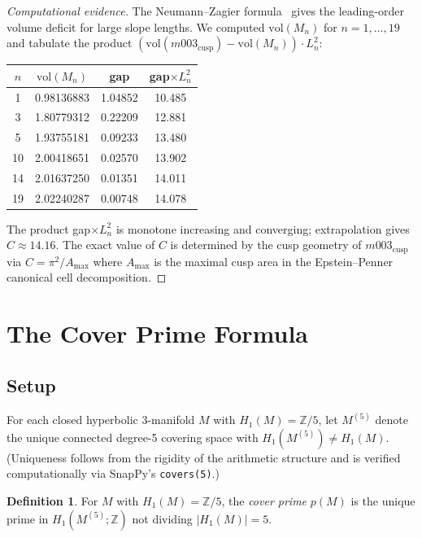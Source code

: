 \documentclass[11pt,a4paper]{article}
\theoremstyle{definition}
\newtheorem{definition}[theorem]{Definition}
\newcommand{\ZZ}{\mathbb{Z}}
\newcommand{\Zfive}{\ZZ/5}
\newcommand{\vol}{\mathrm{vol}}
\newcommand{\Mn}{M_n}
\newcommand{\Mcusp}{m003_{\mathrm{cusp}}}
\begin{document}
\begin{proof}[Computational evidence]
The Neumann--Zagier formula~\cite{NZ85} gives the leading-order
volume deficit for large slope lengths.
We computed $\vol(\Mn)$ for $n=1,\ldots,19$ and tabulate the
product $(\vol(\Mcusp)-\vol(\Mn))\cdot L_n^2$:

\begin{center}
\begin{tabular}{cccc}
\toprule
$n$ & $\vol(\Mn)$ & gap & gap$\times L_n^2$ \\
\midrule
 1 & 0.98136883 & 1.04852 & 10.485 \\
 3 & 1.80779312 & 0.22209 & 12.881 \\
 5 & 1.93755181 & 0.09233 & 13.480 \\
10 & 2.00418651 & 0.02570 & 13.902 \\
14 & 2.01637250 & 0.01351 & 14.011 \\
19 & 2.02240287 & 0.00748 & 14.078 \\
\bottomrule
\end{tabular}
\end{center}

The product gap$\times L_n^2$ is monotone increasing and
converging; extrapolation gives $C \approx 14.16$.
The exact value of $C$ is determined by the cusp geometry
of $\Mcusp$ via $C = \pi^2/A_{\mathrm{max}}$ where
$A_{\mathrm{max}}$ is the maximal cusp area in the
Epstein--Penner canonical cell decomposition.
\end{proof}

\section{The Cover Prime Formula}
\label{sec:cover}

\subsection{Setup}

For each closed hyperbolic 3-manifold $M$ with $H_1(M)=\Zfive$,
let $M^{(5)}$ denote the unique connected degree-5 covering space
with $H_1(M^{(5)}) \neq H_1(M)$.
(Uniqueness follows from the rigidity of the arithmetic structure
and is verified computationally via SnapPy's \texttt{covers(5)}.)

\begin{definition}
For $M$ with $H_1(M)=\Zfive$, the \emph{cover prime} $p(M)$ is
the unique prime in $H_1(M^{(5)};\ZZ)$ not dividing $|H_1(M)|=5$.
\end{definition}
\end{document}
